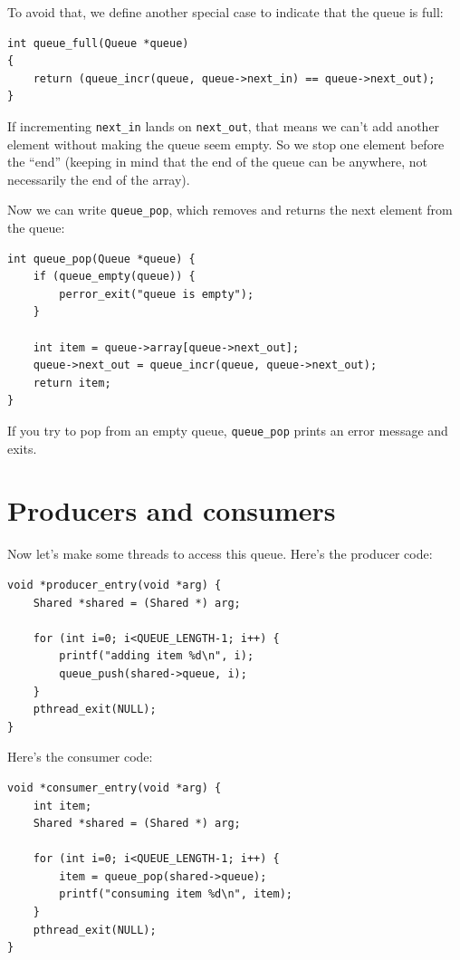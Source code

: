 \documentclass[12pt]{book}
\begin{document}
{To avoid that, we define another special case to indicate that the
queue is full:

\begin{verbatim}
int queue_full(Queue *queue)
{
    return (queue_incr(queue, queue->next_in) == queue->next_out);
}
\end{verbatim}

If incrementing \verb"next_in" lands on \verb"next_out", that means
we can't add another element without making the queue seem empty.  So
we stop one element before the ``end'' (keeping in mind that the end of
the queue can be anywhere, not necessarily the end of the array).

Now we can write \verb"queue_pop", which removes and returns the next
element from the queue:

\begin{verbatim}
int queue_pop(Queue *queue) {
    if (queue_empty(queue)) {
        perror_exit("queue is empty");
    }
  
    int item = queue->array[queue->next_out];
    queue->next_out = queue_incr(queue, queue->next_out);
    return item;
}
\end{verbatim}

If you try to pop from an empty queue, \verb"queue_pop" prints
an error message and exits.


\section{Producers and consumers}
\label{prodcon}

Now let's make some threads to access this queue.  Here's the
producer code:

\begin{verbatim}
void *producer_entry(void *arg) {
    Shared *shared = (Shared *) arg;

    for (int i=0; i<QUEUE_LENGTH-1; i++) {
        printf("adding item %d\n", i);
        queue_push(shared->queue, i);
    }
    pthread_exit(NULL);
}
\end{verbatim}

Here's the consumer code:

\begin{verbatim}
void *consumer_entry(void *arg) {
    int item;
    Shared *shared = (Shared *) arg;

    for (int i=0; i<QUEUE_LENGTH-1; i++) {
        item = queue_pop(shared->queue);
        printf("consuming item %d\n", item);
    }
    pthread_exit(NULL);
}
\end{verbatim}

}
\end{document}
